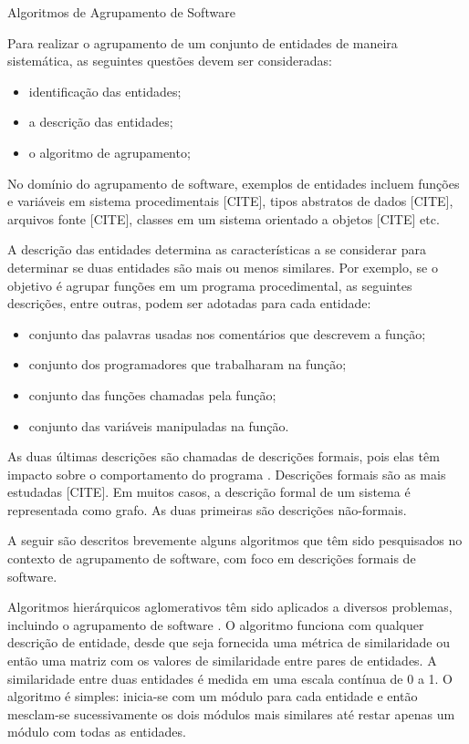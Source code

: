 \begin{section}{Algoritmos de Agrupamento de Software}

Para realizar o agrupamento de um conjunto de entidades de maneira sistemática, as seguintes questões devem ser consideradas:

\begin{itemize}
	\item identificação das entidades;
	\item a descrição das entidades;
	\item o algoritmo de agrupamento;
\end{itemize}

No domínio do agrupamento de software, exemplos de entidades incluem funções e variáveis em sistema procedimentais [CITE], tipos abstratos de dados [CITE], arquivos fonte [CITE], classes em um sistema orientado a objetos [CITE] etc.

A descrição das entidades determina as características a se considerar para determinar se duas entidades são mais ou menos similares. Por exemplo, se o objetivo é agrupar funções em um programa procedimental, as seguintes descrições, entre outras, podem ser adotadas para cada entidade:

\begin{itemize}
	\item conjunto das palavras usadas nos comentários que descrevem a função;
	\item conjunto dos programadores que trabalharam na função;
	\item conjunto das funções chamadas pela função;
	\item conjunto das variáveis manipuladas na função.
\end{itemize}

As duas últimas descrições são chamadas de descrições formais, pois elas têm impacto sobre o comportamento do programa \cite{Anquetil1999}. Descrições formais são as mais estudadas [CITE]. Em muitos casos, a descrição formal de um sistema é representada como grafo. As duas primeiras são descrições não-formais. 

A seguir são descritos brevemente alguns algoritmos que têm sido pesquisados no contexto de agrupamento de software, com foco em descrições formais de software.

Algoritmos hierárquicos aglomerativos têm sido aplicados a diversos problemas, incluindo o agrupamento de software \cite{Anquetil1999,Maqbool2007}. O algoritmo funciona com qualquer descrição de entidade, desde que seja fornecida uma métrica de similaridade ou então uma matriz com os valores de similaridade entre pares de entidades. A similaridade entre duas entidades é medida em uma escala contínua de 0 a 1. O algoritmo é simples: inicia-se com um módulo para cada entidade e então mesclam-se sucessivamente os dois módulos mais similares até restar apenas um módulo com todas as entidades. 


\end{section}
